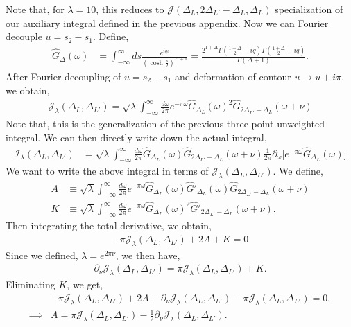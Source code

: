 \documentclass[11pt]{article}
\newcommand{\p}{\partial}
\newcommand{\lb}{\left(}
\newcommand{\rb}{\right)}
\begin{document}
Note that, for $\lambda = 10$, this reduces to $\mathcal{J}(\Delta_L,2\Delta_{L'}-\Delta_L,\Delta_L)$ specialization of our auxiliary integral defined in the previous appendix. Now we can Fourier decouple $u = s_2 - s_1$. Define,
\begin{align}
    \hat G_\Delta(\omega) &= \int_{-\infty}^\infty ds \frac{e^{iqs}}{\lb\cosh\frac{s}{2}\rb^{\Delta +1}}=\frac{2^{1+\Delta}\Gamma\lb\frac{1+\Delta}{2}+ iq\rb\Gamma\lb\frac{1+\Delta}{2}-iq\rb}{\Gamma\lb\Delta +1\rb}.
\end{align}
After Fourier decoupling of $u = s_2 - s_1$ and deformation of contour $u \to u + i\pi$, we obtain,
\begin{align}
    \mathcal{J}_\lambda(\Delta_L,\Delta_{L'}) = \sqrt \lambda \int_{-\infty}^\infty \frac{d\omega}{2\pi} e^{-\pi \omega} \hat G_{\Delta_L}(\omega)^2 \hat G_{2\Delta_{L'}-\Delta_L}(\omega+\nu)
\end{align}
Note that, this is the generalization of the previous three point unweighted integral. We can then directly write down the actual integral,
\begin{align}
    \mathcal{I}_\lambda(\Delta_L,\Delta_{L'}) &= \sqrt \lambda \int_{-\infty}^\infty \frac{d\omega}{2\pi}  \hat G_{\Delta_L}(\omega) \hat G_{2\Delta_{L'}-\Delta_L}(\omega+\nu) \frac{1}{2\pi}\p_\omega \Big[e^{-\pi \omega}\hat G_{\Delta_L}(\omega)\Big]
\end{align}
We want to write the above integral in terms of $\mathcal{J}_\lambda(\Delta_L,\Delta_{L'})$. We define,
\begin{align}
    A &\equiv \sqrt \lambda \int_{-\infty}^\infty \frac{d\omega}{2\pi} e^{-\pi \omega} \hat G_{\Delta_L}(\omega)\hat G'_{\Delta_L}(\omega) \hat G_{2\Delta_{L'}-\Delta_L}(\omega+\nu) \\
    K &\equiv \sqrt \lambda \int_{-\infty}^\infty \frac{d\omega}{2\pi} e^{-\pi \omega} \hat G_{\Delta_L}(\omega)^2\hat G'_{2\Delta_{L'}-\Delta_L}(\omega+\nu).
\end{align}
Then integrating the total derivative, we obtain,
\begin{align}
    -\pi \mathcal{J}_\lambda(\Delta_L,\Delta_{L'}) + 2A + K = 0 
\end{align}
Since we defined, $\lambda = e^{2\pi \nu}$, we then have,
\begin{align}
    \p_\nu \mathcal{J}_\lambda(\Delta_L,\Delta_{L'}) = \pi \mathcal{J}_\lambda(\Delta_L,\Delta_{L'}) + K.
\end{align}
Eliminating $K$, we get,
\begin{align}
    &-\pi \mathcal{J}_\lambda(\Delta_L,\Delta_{L'}) + 2A + \p_\nu \mathcal{J}_\lambda(\Delta_L,\Delta_{L'}) - \pi \mathcal{J}_\lambda(\Delta_L,\Delta_{L'}) = 0,
    \\
    \implies &A = \pi \mathcal{J}_\lambda(\Delta_L,\Delta_{L'}) - \frac{1}{2}\p_\nu \mathcal{J}_\lambda(\Delta_L,\Delta_{L'}).
\end{align}
\end{document}
